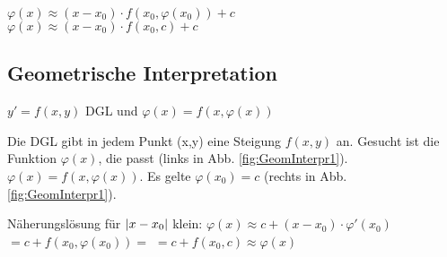 $\varphi(x) \approx (x-x_0) \cdot f(x_0, \varphi(x_0)) + c$\\
$\varphi(x) \approx (x-x_0) \cdot f(x_0, c)+c$


\subsection{Geometrische Interpretation}
$y' = f(x,y)$ DGL und $\varphi(x) = f(x,\varphi(x))$

Die DGL gibt in jedem Punkt (x,y) eine Steigung $f(x,y)$ an. Gesucht ist die Funktion $\varphi(x)$, die passt (links in Abb. \ref{fig:GeomInterpr1}). $\varphi(x) = f(x,\varphi(x))$. Es gelte $\varphi(x_0) = c$ (rechts in Abb. \ref{fig:GeomInterpr1}).

Näherungslösung für $ \left\vert x-x_0 \right\vert $ klein: 
$\varphi(x) \approx c + (x-x_0) \cdot \varphi'(x_0)$
$=c+ f(x_0, \varphi(x_0)) =$
\underline{$=c + f(x_0,c) \approx \varphi(x)$}